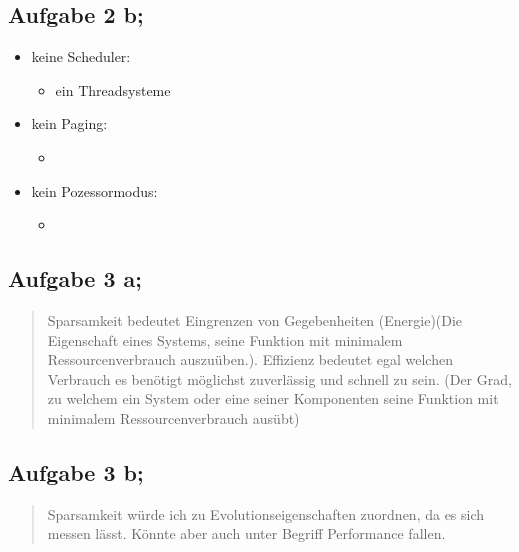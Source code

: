 \subsection{Aufgabe 2 b;}
    \begin{itemize}
        \item keine Scheduler:
            \begin{itemize}
                \item ein Threadsysteme 
            \end{itemize}
        \item kein Paging:
            \begin{itemize}
                \item 
            \end{itemize}
        \item kein Pozessormodus:
            \begin{itemize}
                \item 
            \end{itemize}
    \end{itemize}

\subsection{Aufgabe 3 a;}   
    \begin{abstract}
        Sparsamkeit bedeutet Eingrenzen von Gegebenheiten (Energie)(Die Eigenschaft eines Systems, seine Funktion mit minimalem
        Ressourcenverbrauch auszuüben.). 
        Effizienz bedeutet egal welchen Verbrauch es benötigt möglichst zuverlässig und schnell zu sein. (Der Grad, zu welchem ein System oder eine seiner Komponenten seine
        Funktion mit minimalem Ressourcenverbrauch ausübt)
    \end{abstract}

\subsection{Aufgabe 3 b;}
    \begin{abstract}
        Sparsamkeit würde ich zu Evolutionseigenschaften zuordnen, da es sich messen lässt. Könnte aber auch unter Begriff Performance fallen.
    \end{abstract}

